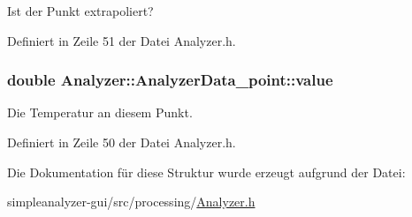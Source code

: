 Ist der Punkt extrapoliert? 



Definiert in Zeile 51 der Datei Analyzer.\-h.

\hypertarget{structAnalyzer_1_1AnalyzerData__point_a150b00a3d0be5d1c75b39292d213cbfa}{
\subsubsection[{value}]{\setlength{\rightskip}{0pt plus 5cm}double Analyzer\-::\-Analyzer\-Data\-\_\-point\-::value}}\label{structAnalyzer_1_1AnalyzerData__point_a150b00a3d0be5d1c75b39292d213cbfa}


Die Temperatur an diesem Punkt. 



Definiert in Zeile 50 der Datei Analyzer.\-h.



Die Dokumentation für diese Struktur wurde erzeugt aufgrund der Datei\-:\begin{DoxyCompactItemize}
\item 
simpleanalyzer-\/gui/src/processing/\hyperlink{Analyzer_8h}{Analyzer.\-h}\end{DoxyCompactItemize}
